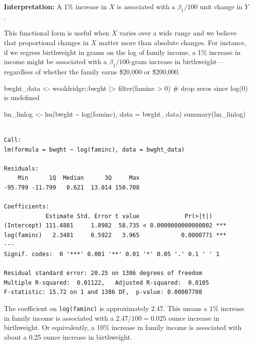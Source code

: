\documentclass[
  letterpaper,
  DIV=11,
  numbers=noendperiod]{scrreprt}
\newenvironment{Shaded}{\begin{snugshade}}{\end{snugshade}}
\newcommand{\AttributeTok}[1]{\textcolor[rgb]{0.40,0.45,0.13}{#1}}
\newcommand{\CommentTok}[1]{\textcolor[rgb]{0.37,0.37,0.37}{#1}}
\newcommand{\DecValTok}[1]{\textcolor[rgb]{0.68,0.00,0.00}{#1}}
\newcommand{\FunctionTok}[1]{\textcolor[rgb]{0.28,0.35,0.67}{#1}}
\newcommand{\NormalTok}[1]{\textcolor[rgb]{0.00,0.23,0.31}{#1}}
\newcommand{\OtherTok}[1]{\textcolor[rgb]{0.00,0.23,0.31}{#1}}
\newcommand{\SpecialCharTok}[1]{\textcolor[rgb]{0.37,0.37,0.37}{#1}}
\begin{document}
\textbf{Interpretation:} A 1\% increase in \(X\) is associated with a
\(\beta_1 / 100\) unit change in \(Y\).

This functional form is useful when \(X\) varies over a wide range and
we believe that proportional changes in \(X\) matter more than absolute
changes. For instance, if we regress birthweight in grams on the log of
family income, a 1\% increase in income might be associated with a
\(\beta_1/100\)-gram increase in birthweight---regardless of whether the
family earns \$20,000 or \$200,000.

\begin{Shaded}
\begin{Highlighting}[]
\NormalTok{bwght\_data }\OtherTok{\textless{}{-}}\NormalTok{ wooldridge}\SpecialCharTok{::}\NormalTok{bwght }\SpecialCharTok{|\textgreater{}}
    \FunctionTok{filter}\NormalTok{(faminc }\SpecialCharTok{\textgreater{}} \DecValTok{0}\NormalTok{)  }\CommentTok{\# drop zeros since log(0) is undefined}

\NormalTok{lm\_linlog }\OtherTok{\textless{}{-}} \FunctionTok{lm}\NormalTok{(bwght }\SpecialCharTok{\textasciitilde{}} \FunctionTok{log}\NormalTok{(faminc), }\AttributeTok{data =}\NormalTok{ bwght\_data)}
\FunctionTok{summary}\NormalTok{(lm\_linlog)}
\end{Highlighting}
\end{Shaded}

\begin{verbatim}

Call:
lm(formula = bwght ~ log(faminc), data = bwght_data)

Residuals:
    Min      1Q  Median      3Q     Max 
-95.799 -11.799   0.621  13.014 150.708 

Coefficients:
            Estimate Std. Error t value             Pr(>|t|)    
(Intercept) 111.4881     1.8982  58.735 < 0.0000000000000002 ***
log(faminc)   2.3481     0.5922   3.965            0.0000771 ***
---
Signif. codes:  0 '***' 0.001 '**' 0.01 '*' 0.05 '.' 0.1 ' ' 1

Residual standard error: 20.25 on 1386 degrees of freedom
Multiple R-squared:  0.01122,   Adjusted R-squared:  0.0105 
F-statistic: 15.72 on 1 and 1386 DF,  p-value: 0.00007708
\end{verbatim}

The coefficient on \texttt{log(faminc)} is approximately 2.47. This
means a 1\% increase in family income is associated with a
\(2.47/100 = 0.025\) ounce increase in birthweight. Or equivalently, a
10\% increase in family income is associated with about a 0.25 ounce
increase in birthweight.
\end{document}

